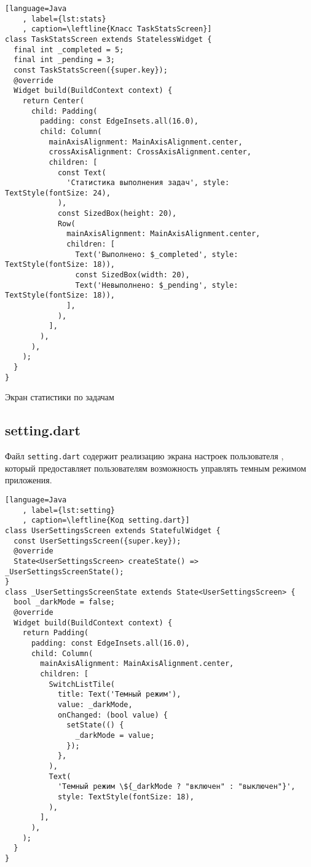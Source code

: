 \begin{lstlisting}[language=Java
	, label={lst:stats}
	, caption=\leftline{Класс TaskStatsScreen}]
class TaskStatsScreen extends StatelessWidget {
  final int _completed = 5;
  final int _pending = 3;
  const TaskStatsScreen({super.key});
  @override
  Widget build(BuildContext context) {
    return Center(
      child: Padding(
        padding: const EdgeInsets.all(16.0),
        child: Column(
          mainAxisAlignment: MainAxisAlignment.center,
          crossAxisAlignment: CrossAxisAlignment.center,
          children: [
            const Text(
              'Статистика выполнения задач', style: TextStyle(fontSize: 24),
            ),
            const SizedBox(height: 20),
            Row(
              mainAxisAlignment: MainAxisAlignment.center,
              children: [
                Text('Выполнено: $_completed', style: TextStyle(fontSize: 18)),
                const SizedBox(width: 20),
                Text('Невыполнено: $_pending', style: TextStyle(fontSize: 18)),
              ],
            ),
          ],
        ),
      ),
    );
  }
}
\end{lstlisting}

\begin{image}
	\caption{Экран статистики по задачам}
	\label{fig:stats}
\end{image}

\clearpage

\subsection{setting.dart}

Файл \texttt{setting.dart}  содержит реализацию экрана
настроек пользователя ,
который предоставляет пользователям возможность
управлять темным режимом приложения.

\begin{lstlisting}[language=Java
	, label={lst:setting}
	, caption=\leftline{Код setting.dart}]
class UserSettingsScreen extends StatefulWidget {
  const UserSettingsScreen({super.key});
  @override
  State<UserSettingsScreen> createState() => _UserSettingsScreenState();
}
class _UserSettingsScreenState extends State<UserSettingsScreen> {
  bool _darkMode = false;
  @override
  Widget build(BuildContext context) {
    return Padding(
      padding: const EdgeInsets.all(16.0),
      child: Column(
        mainAxisAlignment: MainAxisAlignment.center,
        children: [
          SwitchListTile(
            title: Text('Темный режим'),
            value: _darkMode,
            onChanged: (bool value) {
              setState(() {
                _darkMode = value;
              });
            },
          ),
          Text(
            'Темный режим \${_darkMode ? "включен" : "выключен"}',
            style: TextStyle(fontSize: 18),
          ),
        ],
      ),
    );
  }
}
\end{lstlisting}

